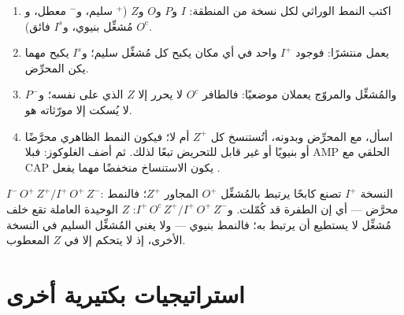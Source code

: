 \begin{method}\label{met:b1:expression-control:lacphenotype}
\begin{enumerate}
  \item اكتب النمط الوراثي لكل نسخة من المنطقة: $I$ و$P$ و$O$
        و$Z$ ($^+$ سليم، و$^-$ معطل، و$O^c$ مُشغِّل بنيوي،
        و$I^s$  فائق).
  \item {} يعمل منتشرًا: فوجود $I^+$ واحد في أي مكان يكبح كل
        مُشغِّل سليم؛ و$I^s$ يكبح مهما يكن المحرِّض.
  \item والمُشغِّل والمروّج يعملان موضعيًا: فالطافر $O^c$ لا يحرر إلا
        $Z$ الذي على  نفسه؛ و$P^-$ لا يُسكت إلا مورّثاته هو.
  \item اسأل، مع المحرِّض وبدونه، أتُستنسخ كل  $Z^+$ أم لا؛
        فيكون النمط الظاهري محرَّضًا أو بنيويًا أو غير قابل
        للتحريض تبعًا لذلك. ثم أضف الغلوكوز: فبلا AMP الحلقي مع
        CAP يكون الاستنساخ منخفضًا مهما يفعل .
\end{enumerate}
\end{method}

\begin{example}\label{ex:b1:expression-control:diploids}
$I^-\,O^+\,Z^+ / I^+\,O^+\,Z^-$: النسخة $I^+$ تصنع كابحًا يرتبط
بالمُشغِّل $O^+$ المجاور  $Z^+$؛ فالنمط محرَّض --- أي إن الطفرة قد
كُمّلت. و$I^+\,O^c\,Z^+ / I^+\,O^+\,Z^-$:  $Z$ الوحيدة العاملة تقع
خلف مُشغِّل لا يستطيع  أن يرتبط به؛ فالنمط بنيوي --- ولا
يغني المُشغِّل السليم في النسخة الأخرى، إذ لا يتحكم إلا في $Z$
المعطوب.
\end{example}

\section{استراتيجيات بكتيرية أخرى}

